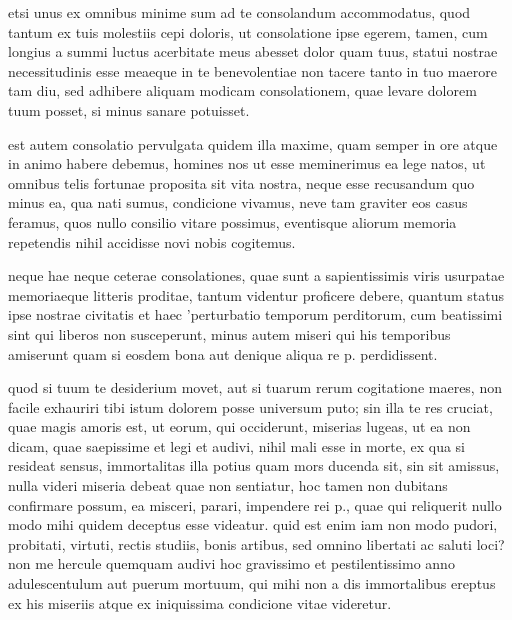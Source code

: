 


 etsi unus ex omnibus minime sum ad te consolandum accommodatus, quod tantum ex tuis molestiis cepi doloris, ut consolatione ipse egerem, tamen, cum longius a summi luctus acerbitate meus abesset dolor quam tuus, statui nostrae necessitudinis esse meaeque in te benevolentiae non tacere tanto in tuo maerore tam diu, sed adhibere aliquam modicam consolationem, quae levare dolorem tuum posset, si minus sanare potuisset.

 est autem consolatio pervulgata quidem illa maxime, quam semper in ore atque in animo habere debemus, homines nos ut esse meminerimus ea lege natos, ut omnibus telis fortunae proposita sit vita nostra, neque esse recusandum quo minus ea, qua nati sumus, condicione vivamus, neve tam graviter eos casus feramus, quos nullo consilio vitare possimus, eventisque aliorum memoria repetendis nihil accidisse novi nobis cogitemus.

 neque hae neque ceterae consolationes, quae sunt a sapientissimis viris usurpatae memoriaeque litteris proditae, tantum videntur proficere debere, quantum status ipse nostrae civitatis et haec 'perturbatio temporum perditorum, cum beatissimi sint qui liberos non susceperunt, minus autem miseri qui his temporibus amiserunt quam si eosdem bona aut denique aliqua re p. perdidissent.

 quod si tuum te desiderium movet, aut si tuarum rerum cogitatione maeres, non facile exhauriri tibi istum dolorem posse universum puto; sin illa te res cruciat, quae magis amoris est, ut eorum, qui occiderunt, miserias lugeas, ut ea non dicam, quae saepissime et legi et audivi, nihil mali esse in morte, ex qua si resideat sensus, immortalitas illa potius quam mors ducenda sit, sin sit amissus, nulla videri miseria debeat quae non sentiatur, hoc tamen non dubitans confirmare possum, ea misceri, parari, impendere rei p., quae qui reliquerit nullo modo mihi quidem deceptus esse videatur. quid est enim iam non modo pudori, probitati, virtuti, rectis studiis, bonis artibus, sed omnino libertati ac saluti loci? non me hercule quemquam audivi hoc gravissimo et pestilentissimo anno adulescentulum aut puerum mortuum, qui mihi non a dis immortalibus ereptus ex his miseriis atque ex iniquissima condicione vitae videretur.

